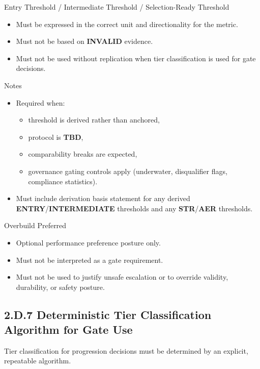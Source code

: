 \documentclass[10pt]{article}
\begin{document}
Entry Threshold / Intermediate Threshold / Selection-Ready Threshold

\begin{itemize}
\item Must be expressed in the correct unit and directionality for the metric.
\item Must not be based on \textbf{INVALID} evidence.
\item Must not be used without replication when tier classification is used for gate decisions.
\end{itemize}

Notes

\begin{itemize}
\item Required when:
  \begin{itemize}
  \item threshold is derived rather than anchored,
  \item protocol is \textbf{TBD},
  \item comparability breaks are expected,
  \item governance gating controls apply (underwater, disqualifier flags, compliance statistics).
  \end{itemize}
\item Must include derivation basis statement for any derived \textbf{ENTRY}/\textbf{INTERMEDIATE} thresholds and any \textbf{STR}/\textbf{AER} thresholds.
\end{itemize}

Overbuild Preferred

\begin{itemize}
\item Optional performance preference posture only.
\item Must not be interpreted as a gate requirement.
\item Must not be used to justify unsafe escalation or to override validity, durability, or safety posture.
\end{itemize}
\clearpage
\subsection*{2.D.7 Deterministic Tier Classification Algorithm for Gate Use}
{}

Tier classification for progression decisions must be determined by an explicit, repeatable algorithm.
\end{document}
